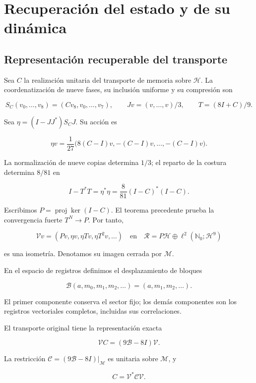 \section{Recuperación del estado y de su dinámica}
\label{nuclear:3}
\subsection{Representación recuperable del transporte}

Sea \(C\) la realización unitaria del transporte de memoria sobre \(\mathcal H\). La coordenatización de nueve fases, su inclusión uniforme y su compresión son

\[
S_C(v_0,\ldots,v_8)=(Cv_8,v_0,\ldots,v_7),\qquad
Jv=(v,\ldots,v)/3,\qquad T=(8I+C)/9.
\]

Sea \(\eta=(I-JJ^*)S_CJ\). Su acción es

\[
\eta v=\frac1{27}\bigl(8(C-I)v,-(C-I)v,\ldots,-(C-I)v\bigr).
\]

La normalización de nueve copias determina \(1/3\); el reparto de la costura determina \(8/81\) en

\begin{equation}
I-T^*T=\eta^*\eta=\frac8{81}(I-C)^*(I-C).
\label{nuc03:eq:1}
\end{equation}

Escribimos \(P=\operatorname{proj}\ker(I-C)\). El teorema precedente prueba la convergencia fuerte \(T^N\to P\). Por tanto,

\begin{equation}
\mathcal Vv=(Pv,\eta v,\eta Tv,\eta T^2v,\ldots)
\quad\text{en}\quad
\mathcal R=P\mathcal H\oplus\ell^2(\mathbb N_0;\mathcal H^9)
\label{nuc03:eq:2}
\end{equation}

es una isometría. Denotamos su imagen cerrada por \(\mathcal M\).

En el espacio de registros definimos el desplazamiento de bloques

\begin{equation}
\mathcal B(a,m_0,m_1,m_2,\ldots)=(a,m_1,m_2,\ldots).
\label{nuc03:eq:3}
\end{equation}

El primer componente conserva el sector fijo; los demás componentes son los registros vectoriales completos, incluidas sus correlaciones.

\begin{theorem}
\label{nuc03:transporte}
El transporte original tiene la representación exacta

\begin{equation}
\boxed{\mathcal V C=(9\mathcal B-8I)\mathcal V.}
\label{nuc03:eq:4}
\end{equation}

La restricción \(\mathcal C=(9\mathcal B-8I)|_{\mathcal M}\) es unitaria sobre \(\mathcal M\), y

\begin{equation}
C=\mathcal V^*\mathcal C\mathcal V.
\label{nuc03:eq:5}
\end{equation}
\end{theorem}

